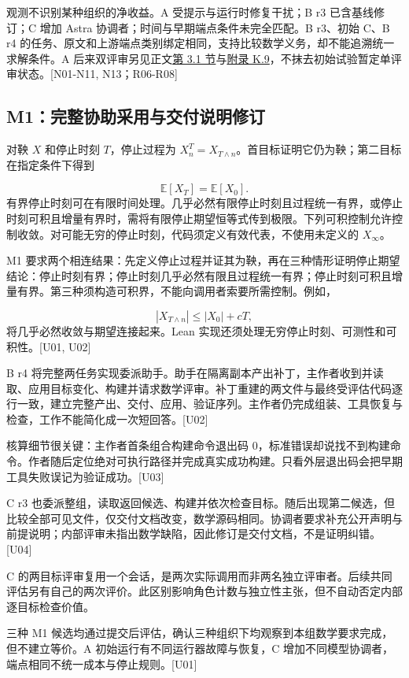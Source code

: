 观测不识别某种组织的净收益。A 受提示与运行时修复干扰；B r3 已含基线修订；C 增加 Astra 协调者；时间与早期端点条件未完全匹配。B r3、初始 C、B r4 的任务、原文和上游端点类别绑定相同，支持比较数学义务，却不能追溯统一求解条件。A 后来双评审另见正文\href{zh.pdf\#section-3-1}{第 3.1 节}与\hyperlink{k9}{附录 K.9}，不抹去初始试验暂定单评审状态。[N01-N11, N13；R06-R08]

\subsection[M1：完整协助采用与交付说明修订]{\texorpdfstring{\protect\hypertarget{g11}{}M1：完整协助采用与交付说明修订}{M1：完整协助采用与交付说明修订}}
对鞅 $X$ 和停止时刻 $T$，停止过程为 $X^T_n=X_{T\wedge n}$。首目标证明它仍为鞅；第二目标在指定条件下得到

\[
\mathbb E[X_T]=\mathbb E[X_0].
\]
有界停止时刻可在有限时间处理。几乎必然有限停止时刻且过程统一有界，或停止时刻可积且增量有界时，需将有限停止期望恒等式传到极限。下列可积控制允许控制收敛。对可能无穷的停止时刻，代码须定义有效代表，不使用未定义的 $X_\infty$。

M1 要求两个相连结果：先定义停止过程并证其为鞅，再在三种情形证明停止期望结论：停止时刻有界；停止时刻几乎必然有限且过程统一有界；停止时刻可积且增量有界。第三种须构造可积界，不能向调用者索要所需控制。例如，

\[
|X_{T\wedge n}|\leq |X_0|+cT,
\]
将几乎必然收敛与期望连接起来。Lean 实现还须处理无穷停止时刻、可测性和可积性。[U01, U02]

B r4 将完整两任务实现委派助手。助手在隔离副本产出补丁，主作者收到并读取、应用目标变化、构建并请求数学评审。补丁重建的两文件与最终受评估代码逐行一致，建立完整产出、交付、应用、验证序列。主作者仍完成组装、工具恢复与检查，工作不能简化成一次短回答。[U02]

核算细节很关键：主作者首条组合构建命令退出码 0，标准错误却说找不到构建命令。作者随后定位绝对可执行路径并完成真实成功构建。只看外层退出码会把早期工具失败误记为验证成功。[U03]

C r3 也委派整组，读取返回候选、构建并依次检查目标。随后出现第二候选，但比较全部可见文件，仅交付文档改变，数学源码相同。协调者要求补充公开声明与前提说明；内部评审未指出数学缺陷，因此修订是交付文档，不是证明纠错。[U04]

C 的两目标评审复用一个会话，是两次实际调用而非两名独立评审者。后续共同评估另有自己的两次评价。此区别影响角色计数与独立性主张，但不自动否定内部逐目标检查价值。

三种 M1 候选均通过提交后评估，确认三种组织下均观察到本组数学要求完成，但不建立等价。A 初始运行有不同运行器故障与恢复，C 增加不同模型协调者，端点相同不统一成本与停止规则。[U01]

